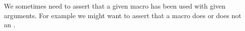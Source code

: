 %
%
%
\stopTestSuite


We sometimes need to assert that a given macro has been used with given 
arguments. For example we might want to assert that a macro does or does 
not  an \type{\errmessage}.

\startMkIVCode
\def\assertMacroExpanded#1#2{%
  \directlua{%
    thirddata.contests.assertMacroExpanded('#1', 1, '#2')
  }
}
\def\assertMacroNeverExpanded#1#2{%
  \directlua{%
    thirddata.contests.assertMacroNeverExpanded('#1', '#2')
  }
}
\def\assertMacroExpandedNTimes#1#2#3{%
  \directlua{%
    thirddata.contests.assertMacroExpanded('#1', #2, '#3')
  }
}
\stopMkIVCode

